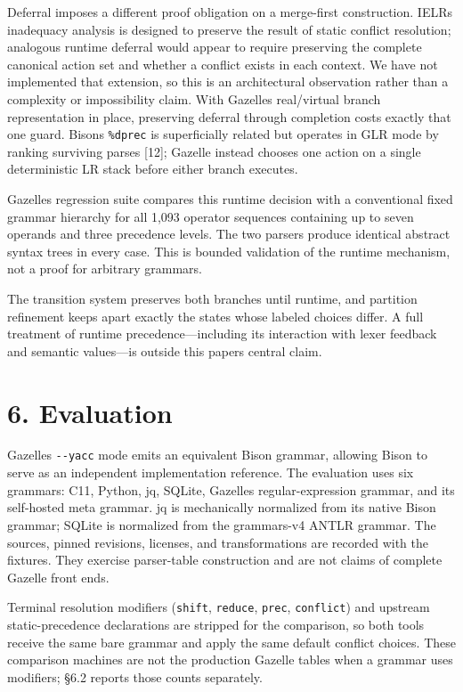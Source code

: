 \documentclass[
  10pt,
]{article}
\begin{document}
Deferral imposes a different proof obligation on a merge-first
construction. IELR\textquotesingle s inadequacy analysis is designed to
preserve the result of static conflict resolution; analogous runtime
deferral would appear to require preserving the complete canonical
action set and whether a conflict exists in each context. We have not
implemented that extension, so this is an architectural observation
rather than a complexity or impossibility claim. With
Gazelle\textquotesingle s real/virtual branch representation in place,
preserving deferral through completion costs exactly that one guard.
Bison\textquotesingle s \texttt{\%dprec} is superficially related but
operates in GLR mode by ranking surviving parses {[}12{]}; Gazelle
instead chooses one action on a single deterministic LR stack before
either branch executes.

Gazelle\textquotesingle s regression suite compares this runtime
decision with a conventional fixed grammar hierarchy for all 1,093
operator sequences containing up to seven operands and three precedence
levels. The two parsers produce identical abstract syntax trees in every
case. This is bounded validation of the runtime mechanism, not a proof
for arbitrary grammars.

The transition system preserves both branches until runtime, and
partition refinement keeps apart exactly the states whose labeled
choices differ. A full treatment of runtime precedence---including its
interaction with lexer feedback and semantic values---is outside this
paper\textquotesingle s central claim.

\hypertarget{6-evaluation}{%
\section{6. Evaluation}\label{6-evaluation}}

Gazelle\textquotesingle s \texttt{-\/-yacc} mode emits an equivalent
Bison grammar, allowing Bison to serve as an independent implementation
reference. The evaluation uses six grammars: C11, Python, jq, SQLite,
Gazelle\textquotesingle s regular-expression grammar, and its
self-hosted meta grammar. jq is mechanically normalized from its native
Bison grammar; SQLite is normalized from the grammars-v4 ANTLR grammar.
The sources, pinned revisions, licenses, and transformations are
recorded with the fixtures. They exercise parser-table construction and
are not claims of complete Gazelle front ends.

Terminal resolution modifiers (\texttt{shift}, \texttt{reduce},
\texttt{prec}, \texttt{conflict}) and upstream static-precedence
declarations are stripped for the comparison, so both tools receive the
same bare grammar and apply the same default conflict choices. These
comparison machines are not the production Gazelle tables when a grammar
uses modifiers; §6.2 reports those counts separately.
\end{document}
